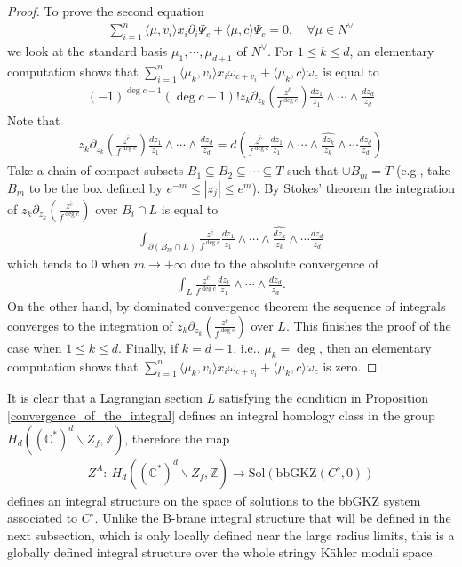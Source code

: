 \documentclass[11pt,reqno]{amsart}
\def\CC {{\mathbb C}}
\def\Z {{\mathbb Z}}
\theoremstyle{definition}
\numberwithin{equation}{section}
\begin{document}
\begin{proof}
	To prove the second equation
	\begin{align*}
		 \sum_{i=1}^n\langle\mu,v_i\rangle x_i\partial_i\Psi_c+\langle\mu,c\rangle\Psi_c=0,\quad \forall \mu\in N^{\vee}
	\end{align*}
	we look at the standard basis $\mu_1,\cdots,\mu_{d+1}$ of $N^{\vee}$. For $1\leq k\leq d$, an elementary computation shows that $\sum_{i=1}^n\langle\mu_k,v_i\rangle x_i\omega_{c+v_i}+\langle\mu_k,c\rangle\omega_c$ is equal to
	\begin{align*}
		(-1)^{\deg c-1}(\deg c-1)!z_k\partial_{z_k}\left(\frac{z^{\bar{c}}}{f^{\deg c}}\right)\frac{dz_1}{z_1}\wedge\cdots\wedge\frac{dz_d}{z_d}
	\end{align*}
	Note that
	\begin{align*}
		z_k\partial_{z_k}\left(\frac{z^{\bar{c}}}{f^{\deg c}}\right)\frac{dz_1}{z_1}\wedge\cdots\wedge\frac{dz_d}{z_d}=d\left(\frac{z^{\bar{c}}}{f^{\deg c}}\frac{dz_1}{z_1}\wedge\cdots\wedge\widehat{\frac{dz_k}{z_k}} \wedge\cdots\frac{dz_d}{z_d}\right)
	\end{align*}
	Take a chain of compact subsets $B_1\subseteq B_2\subseteq\cdots\subseteq T$ such that $\cup B_m =T$ (e.g., take $B_m$ to be the box defined by $e^{-m}\leq|z_j|\leq e^m$). By Stokes' theorem the integration of $z_k\partial_{z_k}\left(\frac{z^{\bar{c}}}{f^{\deg c}}\right)$ over $B_i\cap L$ is equal to
	\begin{align*}
		\int_{\partial(B_m\cap L)}\frac{z^{\bar{c}}}{f^{\deg c}}\frac{dz_1}{z_1}\wedge\cdots\wedge\widehat{\frac{dz_k}{z_k}} \wedge\cdots\frac{dz_d}{z_d}
	\end{align*}
	which tends to 0 when $m\rightarrow +\infty$ due to the absolute convergence of 
	\begin{align*}
		\int_{L}\frac{z^{\bar{c}}}{f^{\deg c}}\frac{dz_1}{z_1}\wedge\cdots\wedge\frac{dz_d}{z_d}.
	\end{align*}
	On the other hand, by dominated convergence theorem the sequence of integrals converges to the integration of $z_k\partial_{z_k}\left(\frac{z^{\bar{c}}}{f^{\deg c}}\right)$ over $L$. This finishes the proof of the case when $1\leq k\leq d$.
	Finally, if $k=d+1$, i.e., $\mu_k=\deg$, then an elementary computation shows that $\sum_{i=1}^n\langle\mu_k,v_i\rangle x_i\omega_{c+v_i}+\langle\mu_k,c\rangle\omega_c$ is zero.
\end{proof}

\smallskip

It is clear that a Lagrangian section $L$ satisfying the condition in Proposition \ref{convergence_of_the_integral} defines an integral homology class in the group $H_d((\CC^*)^d\backslash Z_f,\Z)$, therefore the map
\begin{align*}
	Z^A:\ H_d((\CC^*)^d\backslash Z_f,\Z) \rightarrow \mathrm{Sol}(\mathrm{bbGKZ}(C^{\circ},0))
\end{align*}
defines an integral structure on the space of solutions to the bbGKZ system associated to $C^{\circ}$. Unlike the B-brane integral structure that will be defined in the next subsection, which is only locally defined near the large radius limits, this is a globally defined integral structure over the whole stringy K\"ahler moduli space.
\end{document}
